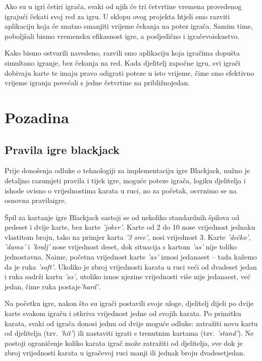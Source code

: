 \documentclass[conference]{IEEEtran}
\begin{document}
Ako su u igri četiri igrača, svaki od njih će tri četvrtine vremena provedenog igrajući čekati svoj red za igru. U sklopu ovog projekta htjeli smo razviti aplikaciju koja će znatno smanjiti vrijeme čekanja na potez igrača. Samim time, poboljšali bismo vremensku efikasnost igre, a posljedično i igračevo\break iskustvo.

Kako bismo ostvarili navedeno, razvili smo aplikaciju koja igračima dopušta simultano igranje, bez čekanja na red. Kada djelitelj započne igru, svi igrači dobivaju karte te imaju pravo odigrati poteze u isto vrijeme, čime smo efektivno vrijeme igranja povećali s jedne četvrtine na približno\break jedan.


\section{Pozadina}

\subsection{Pravila igre blackjack}

Prije donošenja odluke o tehnologiji za implementaciju igre Blackjack, nužno je detaljno razumjeti pravila i tijek igre, moguće poteze igrača, logiku djelitelja i ishode ovisno o vrijednostima karata u ruci, no za početak, osvrnimo se na osnovna pravila\break igre.

Špil za kartanje igre Blackjack sastoji se od nekoliko standardnih špilova od pedeset i dvije karte, bez karte \textit{'joker'}. Karte od 2 do 10 nose vrijednost jednaku vlastitom broju, tako na primjer karta \textit{'3 srce'}, nosi vrijednost 3. Karte \textit{'dečko'}, \textit{'dama'} i \textit{'kralj'} nose vrijednost deset, dok situacija s kartom \textit{'as'} nije toliko jednostavna. Naime, početna vrijednost karte \textit{'as'} iznosi jedanaest – tada kažemo da je ruka \textit{'soft'}. Ukoliko je zbroj vrijednosti karata u ruci veći od dvadeset jedan i ruka sadrži kartu \textit{'as'}, utoliko iznos njezine vrijednosti više nije jedanaest, već jedan, čime ruka postaje\break \textit{'hard'}.

Na početku igre, nakon što su igrači postavili svoje uloge, djelitelj dijeli po dvije karte svakom igraču i otkriva vrijednost jedne od svojih karata. Po primitku karata, svaki od igrača donosi jednu od dvije moguće odluke: zatražiti novu kartu od djelitelja (tzv. \textit{'hit'}) ili nastaviti igrati s trenutnim kartama (tzv. \textit{'stand'}). Ne postoji ograničenje koliko karata igrač može zatražiti od djelitelja, sve dok je zbroj vrijednosti karata u igračevoj ruci manji ili jednak broju dvadeset\break jedan. 
\end{document}
